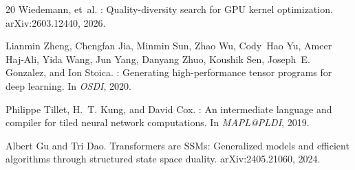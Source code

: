 \documentclass{article}
\begin{document}
\begin{thebibliography}{20}
Wiedemann, et~al.
: Quality-diversity search for {GPU} kernel optimization.
\newblock arXiv:2603.12440, 2026.

Lianmin Zheng, Chengfan Jia, Minmin Sun, Zhao Wu, Cody~Hao Yu, Ameer Haj-Ali, Yida Wang, Jun Yang, Danyang Zhuo, Koushik Sen, Joseph~E. Gonzalez, and Ion Stoica.
: Generating high-performance tensor programs for deep learning.
\newblock In \emph{OSDI}, 2020.

Philippe Tillet, H.~T. Kung, and David Cox.
: An intermediate language and compiler for tiled neural network computations.
\newblock In \emph{MAPL@PLDI}, 2019.

Albert Gu and Tri Dao.
\newblock Transformers are {SSMs}: Generalized models and efficient algorithms through structured state space duality.
\newblock arXiv:2405.21060, 2024.

\end{thebibliography}
\end{document}
